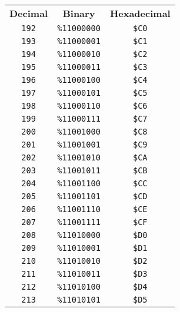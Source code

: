 \begin{multicols}{2}  
\begin{center}
 \begin{tabular}{|c|c|c|}
  \hline
		\textbf{Decimal} & \textbf{Binary} & \textbf{Hexadecimal} \\ \hhline{|=|=|=|}   
    \texttt{192} & \texttt{\%11000000} &  \texttt{\$C0} \\ \hline
  \texttt{193} & \texttt{\%11000001} &  \texttt{\$C1} \\ \hline
  \texttt{194} & \texttt{\%11000010} &  \texttt{\$C2} \\ \hline
  \texttt{195} & \texttt{\%11000011} &  \texttt{\$C3} \\ \hline
  \texttt{196} & \texttt{\%11000100} &  \texttt{\$C4} \\ \hline
  \texttt{197} & \texttt{\%11000101} &  \texttt{\$C5} \\ \hline
  \texttt{198} & \texttt{\%11000110} &  \texttt{\$C6} \\ \hline
  \texttt{199} & \texttt{\%11000111} &  \texttt{\$C7} \\ \hline
  \texttt{200} & \texttt{\%11001000} &  \texttt{\$C8} \\ \hline
  \texttt{201} & \texttt{\%11001001} &  \texttt{\$C9} \\ \hline
  \texttt{202} & \texttt{\%11001010} &  \texttt{\$CA} \\ \hline
  \texttt{203} & \texttt{\%11001011} &  \texttt{\$CB} \\ \hline
  \texttt{204} & \texttt{\%11001100} &  \texttt{\$CC} \\ \hline
  \texttt{205} & \texttt{\%11001101} &  \texttt{\$CD} \\ \hline
  \texttt{206} & \texttt{\%11001110} &  \texttt{\$CE} \\ \hline
  \texttt{207} & \texttt{\%11001111} &  \texttt{\$CF} \\ \hline
  \texttt{208} & \texttt{\%11010000} &  \texttt{\$D0} \\ \hline
  \texttt{209} & \texttt{\%11010001} &  \texttt{\$D1} \\ \hline
  \texttt{210} & \texttt{\%11010010} &  \texttt{\$D2} \\ \hline
  \texttt{211} & \texttt{\%11010011} &  \texttt{\$D3} \\ \hline
  \texttt{212} & \texttt{\%11010100} &  \texttt{\$D4} \\ \hline
  \texttt{213} & \texttt{\%11010101} &  \texttt{\$D5} \\ \hline

\end{tabular}
\end{center}
\end{multicols}
